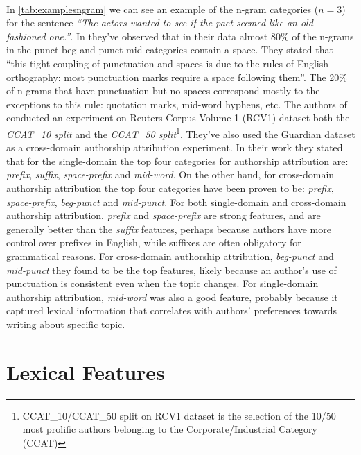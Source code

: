 \paragraph{}
In \autoref{tab:examplesngram} we can see an example of the n-gram categories ($ n = 3 $) for the sentence \textit{\enquote{The actors wanted to see if the pact seemed like an old-fashioned one.}}. 
In \cite{sapkota2015not} they've observed that in their data almost 80\% of the n-grams in the punct-beg and punct-mid categories contain a space. They stated that \enquote{this tight coupling of punctuation and spaces is due to the rules of English orthography: most punctuation marks require a space following them}. The 20\% of n-grams that have punctuation but no spaces correspond mostly to the exceptions to this rule: quotation marks, mid-word hyphens, etc.
The authors of \cite{sapkota2015not} conducted an experiment on Reuters Corpus Volume 1 (RCV1) dataset both the \textit{CCAT\_10 split} and the \textit{CCAT\_50 split}\footnote{CCAT\_10/CCAT\_50 split on RCV1 dataset is the selection of the 10/50 most prolific authors belonging to the Corporate/Industrial Category (CCAT)}. They've also used the Guardian dataset as a cross-domain authorship attribution experiment. In their work they stated that for the single-domain the top four categories for authorship attribution are: \textit{prefix}, \textit{suffix}, \textit{space-prefix} and \textit{mid-word}. On the other hand, for cross-domain authorship attribution the top four categories have been proven to be: \textit{prefix}, \textit{space-prefix}, \textit{beg-punct} and \textit{mid-punct}.
For both single-domain and cross-domain authorship attribution, \textit{prefix} and \textit{space-prefix} are strong features, and are generally better than the \textit{suffix} features, perhaps because authors have more control over prefixes in English,
while suffixes are often obligatory for grammatical reasons. For cross-domain authorship attribution, \textit{beg-punct} and \textit{mid-punct} they found to be the top features, likely because an author’s use of punctuation is consistent even when the topic
changes. For single-domain authorship attribution, \textit{mid-word} was also
a good feature, probably because it captured lexical information that correlates with authors’ preferences towards writing about specific topic.

\section{Lexical Features}

